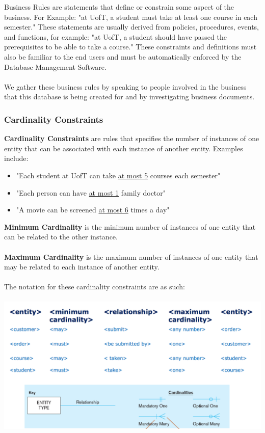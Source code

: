 \documentclass[12pt]{article}
\begin{document}
Business Rules are statements that define or constrain some aspect of the business. For Example: "at UofT, a student must take at least one course in each semester." These statements are usually derived from policies, procedures, events, and functions, for example: "at UofT, a student should have passed the prerequisites to be able to take a course." These constraints and definitions must also be familiar to the end users and must be automatically enforced by the Database Management Software.\\
\\
We gather these business rules by speaking to people involved in the business that this database is being created for and by investigating business documents.

\subsubsection{Cardinality Constraints}

\textbf{Cardinality Constraints} are rules that specifies the number of instances of one entity that can be associated with each instance of another entity. Examples include:
\begin{itemize}
	\item{"Each student at UofT can take \underline{at most 5} courses each semester"}
	\item{"Each person can have \underline{at most 1} family doctor"}
	\item{"A movie can be screened \underline{at most 6} times a day"}
\end{itemize}

\textbf{Minimum Cardinality} is the minimum number of instances of one entity that can be related to the other instance.\\
\\
\textbf{Maximum Cardinality} is the maximum number of instances of one entity that may be related to each instance of another entity.\\
\\
The notation for these cardinality constraints are as such:\\
\\
\includegraphics[scale=0.5]{lec2-3}
\end{document}
